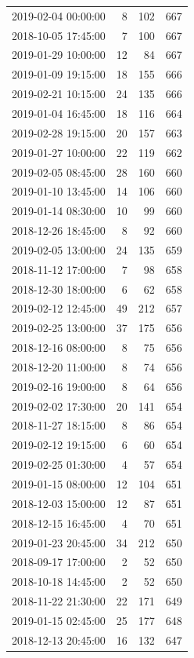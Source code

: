 \begin{tabular}{lrrr}
2019-02-04 00:00:00 & 8 & 102 & 667 \\
2018-10-05 17:45:00 & 7 & 100 & 667 \\
2019-01-29 10:00:00 & 12 & 84 & 667 \\
2019-01-09 19:15:00 & 18 & 155 & 666 \\
2019-02-21 10:15:00 & 24 & 135 & 666 \\
2019-01-04 16:45:00 & 18 & 116 & 664 \\
2019-02-28 19:15:00 & 20 & 157 & 663 \\
2019-01-27 10:00:00 & 22 & 119 & 662 \\
2019-02-05 08:45:00 & 28 & 160 & 660 \\
2019-01-10 13:45:00 & 14 & 106 & 660 \\
2019-01-14 08:30:00 & 10 & 99 & 660 \\
2018-12-26 18:45:00 & 8 & 92 & 660 \\
2019-02-05 13:00:00 & 24 & 135 & 659 \\
2018-11-12 17:00:00 & 7 & 98 & 658 \\
2018-12-30 18:00:00 & 6 & 62 & 658 \\
2019-02-12 12:45:00 & 49 & 212 & 657 \\
2019-02-25 13:00:00 & 37 & 175 & 656 \\
2018-12-16 08:00:00 & 8 & 75 & 656 \\
2018-12-20 11:00:00 & 8 & 74 & 656 \\
2019-02-16 19:00:00 & 8 & 64 & 656 \\
2019-02-02 17:30:00 & 20 & 141 & 654 \\
2018-11-27 18:15:00 & 8 & 86 & 654 \\
2019-02-12 19:15:00 & 6 & 60 & 654 \\
2019-02-25 01:30:00 & 4 & 57 & 654 \\
2019-01-15 08:00:00 & 12 & 104 & 651 \\
2018-12-03 15:00:00 & 12 & 87 & 651 \\
2018-12-15 16:45:00 & 4 & 70 & 651 \\
2019-01-23 20:45:00 & 34 & 212 & 650 \\
2018-09-17 17:00:00 & 2 & 52 & 650 \\
2018-10-18 14:45:00 & 2 & 52 & 650 \\
2018-11-22 21:30:00 & 22 & 171 & 649 \\
2019-01-15 02:45:00 & 25 & 177 & 648 \\
2018-12-13 20:45:00 & 16 & 132 & 647 \\

\end{tabular}
